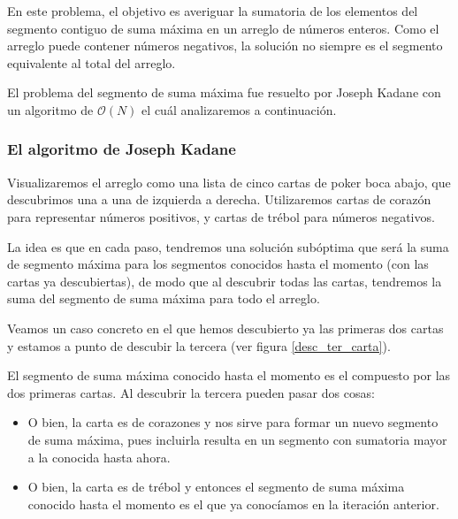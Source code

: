 \documentclass[12pt, a4paper, openany, fleqn]{book}
\newif\ifUsePstPoker
\begin{document}
    En este problema, el objetivo es averiguar la sumatoria de los elementos del segmento contiguo de suma máxima en un arreglo de números enteros.
    Como el arreglo puede contener números negativos, la solución no siempre es el segmento equivalente al total del arreglo.

    El problema del segmento de suma máxima fue resuelto por Joseph Kadane con un algoritmo de $\mathcal{O}(N)$ el cuál analizaremos a continuación.

    \subsubsection*{El algoritmo de Joseph Kadane}
    Visualizaremos el arreglo como una lista de cinco cartas de poker boca abajo, que descubrimos una a una de izquierda a derecha. Utilizaremos cartas de corazón para representar números positivos, y cartas de trébol para números negativos.

    La idea es que en cada paso, tendremos una solución subóptima que será la suma de segmento máxima para los segmentos conocidos hasta el momento (con las cartas ya descubiertas), de modo que al descubrir todas las cartas, tendremos la suma del segmento de suma máxima para todo el arreglo.

    Veamos un caso concreto en el que hemos descubierto ya las primeras dos cartas y estamos a punto de descubir la tercera (ver figura \ref{desc_ter_carta}).

    \ifUsePstPoker
        \begin{figure}[h]
            \centering
            \psset{framebg=beige}\crdsevh
            \psset{framebg=beige}\crdtwoh
            \psset{backcolor=red}\crdback
            \psset{backcolor=red}\crdback
            \psset{backcolor=red}\crdback
            \rput(-8.2,-1){\textbf{\^}} %

            \caption{Descubriendo la tercera carta} \label{desc_ter_carta}
        \end{figure}
    \fi

    El segmento de suma máxima conocido hasta el momento es el compuesto por las dos primeras cartas. Al descubrir la tercera pueden pasar dos cosas:
    \begin{itemize}
        \item O bien, la carta es de corazones y nos sirve para formar un nuevo segmento de suma máxima, pues incluirla resulta en un segmento con sumatoria mayor a la conocida hasta ahora.
        \item O bien, la carta es de trébol y entonces el segmento de suma máxima conocido hasta el momento es el que ya conocíamos en la iteración anterior.
    \end{itemize}
\end{document}
